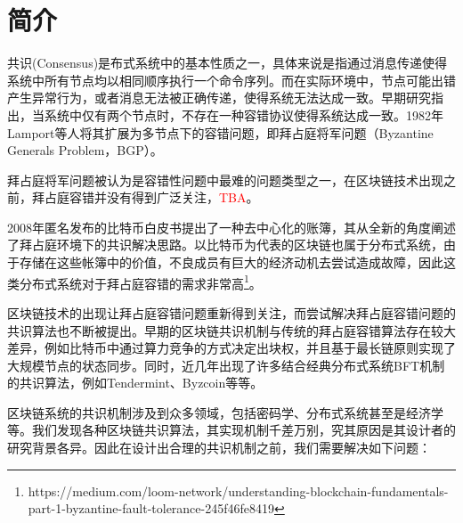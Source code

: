 \section{简介}
共识(Consensus)是布式系统中的基本性质之一，具体来说是指通过消息传递使得系统中所有节点均以相同顺序执行一个命令序列\cite{lamport1978implementation}。而在实际环境中，节点可能出错产生异常行为，或者消息无法被正确传递，使得系统无法达成一致\cite{pease1980reaching}。早期研究指出，当系统中仅有两个节点时，不存在一种容错协议使得系统达成一致\cite{akkoyunlu1975some}。1982年Lamport等人将其扩展为多节点下的容错问题，即拜占庭将军问题（Byzantine Generals Problem，BGP）\cite{lamport1982byzantine}。

拜占庭将军问题被认为是容错性问题中最难的问题类型之一，在区块链技术出现之前，拜占庭容错并没有得到广泛关注，\textcolor{red}{TBA}。

2008年匿名发布的比特币白皮书\cite{nakamoto2008bitcoin}提出了一种去中心化的账簿，其从全新的角度阐述了拜占庭环境下的共识解决思路。以比特币为代表的区块链也属于分布式系统，由于存储在这些帐簿中的价值，不良成员有巨大的经济动机去尝试造成故障，因此这类分布式系统对于拜占庭容错的需求非常高\footnote{https://medium.com/loom-network/understanding-blockchain-fundamentals-part-1-byzantine-fault-tolerance-245f46fe8419}。

区块链技术的出现让拜占庭容错问题重新得到关注，而尝试解决拜占庭容错问题的共识算法也不断被提出。早期的区块链共识机制与传统的拜占庭容错算法存在较大差异，例如比特币中通过算力竞争的方式决定出块权，并且基于最长链原则实现了大规模节点的状态同步\cite{nakamoto2008bitcoin}。同时，近几年出现了许多结合经典分布式系统BFT机制的共识算法，例如Tendermint\cite{buchman2016tendermint}、Byzcoin\cite{kogias2016enhancing}等等。








区块链系统的共识机制涉及到众多领域，包括密码学、分布式系统甚至是经济学等。我们发现各种区块链共识算法，其实现机制千差万别，究其原因是其设计者的研究背景各异。因此在设计出合理的共识机制之前，我们需要解决如下问题：

